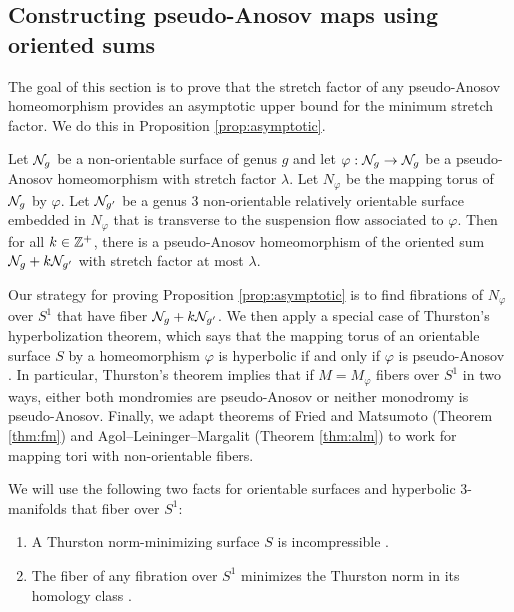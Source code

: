 \subsection{Constructing pseudo-Anosov maps using oriented sums}
\label{sec:constr-psuedo-anos}
The goal of this section is to prove that the stretch factor of any pseudo-Anosov homeomorphism provides an asymptotic upper bound for the minimum stretch factor.  We do this in Proposition \ref{prop:asymptotic}.


\begin{prop}\label{prop:asymptotic}
Let $\mathcal{N}_g$ be a non-orientable surface of genus $g$ and let $\varphi:\mathcal{N}_g\rightarrow \mathcal{N}_g$ be a pseudo-Anosov homeomorphism with stretch factor $\lambda$.  Let $N_\varphi$ be the mapping torus of $\mathcal{N}_g$ by $\varphi$.  Let $\mathcal{N}_{g'}$ be a genus $3$ non-orientable relatively orientable surface embedded in $N_\varphi$ that is transverse to the suspension flow associated to $\varphi$.  Then for all $k\in\mathbb{Z}^+$, there is a pseudo-Anosov homeomorphism of the oriented sum $\mathcal{N}_{g}+k\mathcal{N}_{g'}$ with stretch factor at most $\lambda$.
\end{prop}

Our strategy for proving Proposition \ref{prop:asymptotic} is to find fibrations of $N_{\varphi}$ over $S^1$ that have fiber $\mathcal{N}_g+k\mathcal{N}_{g'}$.  We then apply a special case of Thurston's hyperbolization theorem, which says that the mapping torus of an orientable surface $S$ by a homeomorphism $\varphi$ is hyperbolic if and only if $\varphi$ is pseudo-Anosov \cite[Theorem 0.1]{thurston_hyp}.  In particular, Thurston's theorem implies that if $M=M_\varphi$ fibers over $S^1$ in two ways, either both mondromies are pseudo-Anosov or neither monodromy is pseudo-Anosov.  Finally, we adapt theorems of Fried and Matsumoto (Theorem \ref{thm:fm}) and Agol--Leininger--Margalit (Theorem \ref{thm:alm}) to work for mapping tori with non-orientable fibers.


\medskip
We will use the following two facts for orientable surfaces and hyperbolic 3-manifolds that fiber over $S^1$:
\begin{enumerate}
 \item A Thurston norm-minimizing surface $S$ is incompressible \cite[Lemma 5.7]{calegari2007foliations}.
\item  The fiber of any fibration over $S^1$ minimizes the Thurston norm in its homology class \cite[Corollary 2]{thurston1986norm}.
\end{enumerate}

